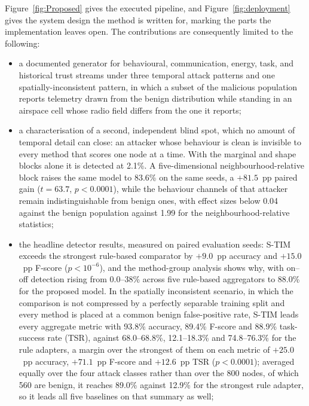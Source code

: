 \documentclass[notspecified,article,submit,moreauthors]{Definitions/mdpi}
\begin{document}
Figure~\ref{fig:Proposed} gives the executed pipeline, and Figure~\ref{fig:deployment} gives the system design the method is written for, marking the parts the implementation leaves open. The contributions are consequently limited to the following:

\begin{itemize}
    \item a documented generator for behavioural, communication, energy, task, and historical trust streams under three temporal attack patterns and one spatially-inconsistent pattern, in which a subset of the malicious population reports telemetry drawn from the benign distribution while standing in an airspace cell whose radio field differs from the one it reports;
    \item a characterisation of a second, independent blind spot, which no amount of temporal detail can close: an attacker whose behaviour is clean is invisible to every method that scores one node at a time. With the marginal and shape blocks alone it is detected at 2.1\%. A five-dimensional neighbourhood-relative block raises the same model to 83.6\% on the same seeds, a $+81.5$~pp paired gain ($t=63.7$, $p<0.0001$), while the behaviour channels of that attacker remain indistinguishable from benign ones, with effect sizes below 0.04 against the benign population against 1.99 for the neighbourhood-relative statistics;
    \item the headline detector results, measured on paired evaluation seeds: S-TIM exceeds the strongest rule-based comparator by $+9.0$~pp accuracy and $+15.0$~pp F-score ($p<10^{-6}$), and the method-group analysis shows why, with on--off detection rising from 0.0--38\% across five rule-based aggregators to 88.0\% for the proposed model. In the spatially inconsistent scenario, in which the comparison is not compressed by a perfectly separable training split and every method is placed at a common benign false-positive rate, S-TIM leads every aggregate metric with 93.8\% accuracy, 89.4\% F-score and 88.9\% task-success rate (TSR), against 68.0--68.8\%, 12.1--18.3\% and 74.8--76.3\% for the rule adapters, a margin over the strongest of them on each metric of $+25.0$~pp accuracy, $+71.1$~pp F-score and $+12.6$~pp TSR ($p<0.0001$); averaged equally over the four attack classes rather than over the 800 nodes, of which 560 are benign, it reaches 89.0\% against 12.9\% for the strongest rule adapter, so it leads all five baselines on that summary as well;

\end{itemize}
\end{document}
